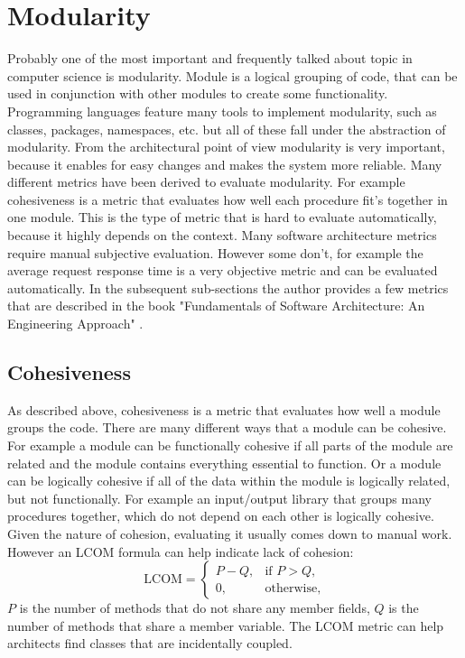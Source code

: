 \documentclass[12pt]{article}
\begin{document}
\section{Modularity}
Probably one of the most important and frequently talked about topic in computer science is modularity. Module is a logical grouping of code, that can be used in conjunction with other modules to create some functionality. Programming languages feature many tools to implement modularity, such as classes, packages, namespaces, etc. but all of these fall under the abstraction of modularity. From the architectural point of view modularity is very important, because it enables for easy changes and makes the system more reliable. Many different metrics have been derived to evaluate modularity. For example cohesiveness is a metric that evaluates how well each procedure fit's together in one module. This is the type of metric that is hard to evaluate automatically, because it highly depends on the context. Many software architecture metrics require manual subjective evaluation. However some don't, for example the average request response time is a very objective metric and can be evaluated automatically. In the subsequent sub-sections the author provides a few metrics that are described in the book "Fundamentals of Software Architecture: An Engineering Approach" \cite{RF20}.

\subsection{Cohesiveness}
As described above, cohesiveness is a metric that evaluates how well a module groups the code. There are many different ways that a module can be cohesive. For example a module can be functionally cohesive if all parts of the module are related and the module contains everything essential to function. Or a module can be logically cohesive if all of the data within the module is logically related, but not functionally. For example an input/output library that groups many procedures together, which do not depend on each other is logically cohesive. Given the nature of cohesion, evaluating it usually comes down to manual work. However an LCOM formula can help indicate lack of cohesion:
\[
\text{LCOM} = 
\begin{cases} 
P - Q, & \text{if } P > Q, \\
0, & \text{otherwise},
\end{cases}
\]
$P$ is the number of methods that do not share any member fields, $Q$ is the number of methods that share a member variable. The LCOM metric can help architects find classes that are incidentally coupled.
\end{document}
